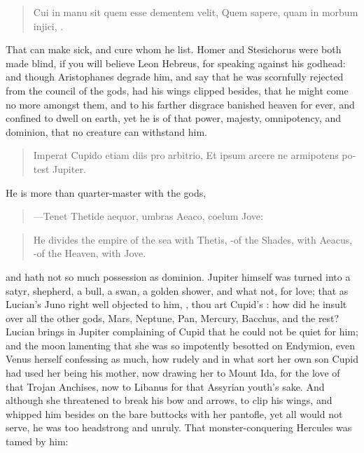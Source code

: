 \begin{latin}
\begin{verse}%
Cui in manu sit quem esse dementem velit,
Quem sapere, quam in morbum injici, \etc{}.
\end{verse}%
\end{latin}

That can make sick, and cure whom he list. Homer and Stesichorus were
both made blind, if you will believe Leon Hebreus, for speaking
against his godhead: and though Aristophanes degrade him, and say that
he was scornfully rejected from the council of the gods, had his
wings clipped besides, that he might come no more amongst them, and to
his farther disgrace banished heaven for ever, and confined to dwell on
earth, yet he is of that power, majesty, omnipotency, and
dominion, that no creature can withstand him.

\begin{latin}
\begin{verse}%
Imperat Cupido etiam diis pro arbitrio,
Et ipsum arcere ne armipotens potest Jupiter.
\end{verse}%
\end{latin}

He is more than quarter-master with the gods,

\begin{latin}
\begin{verse}%
---Tenet
Thetide aequor, umbras Aeaco, coelum Jove:
\end{verse}%
\end{latin}
\translationrule%
\begin{verse}%
He divides the empire of the sea with Thetis,
-of the Shades, with Aeacus, -of the Heaven, with Jove.
\end{verse}%

and hath not so much possession as dominion. Jupiter himself was turned
into a satyr, shepherd, a bull, a swan, a golden shower, and what not,
for love; that as Lucian's Juno right well objected to him, , thou art Cupid's : how did he insult over all
the other gods, Mars, Neptune, Pan, Mercury, Bacchus, and the rest?
 Lucian brings in Jupiter complaining of Cupid that he could not
be quiet for him; and the moon lamenting that she was so impotently
besotted on Endymion, even Venus herself confessing as much, how rudely
and in what sort her own son Cupid had used her being his mother,
now drawing her to Mount Ida, for the love of that Trojan Anchises, now
to Libanus for that Assyrian youth's sake. And although she threatened
to break his bow and arrows, to clip his wings, and whipped him
besides on the bare buttocks with her pantofle, yet all would not
serve, he was too headstrong and unruly. That monster-conquering
Hercules was tamed by him:

